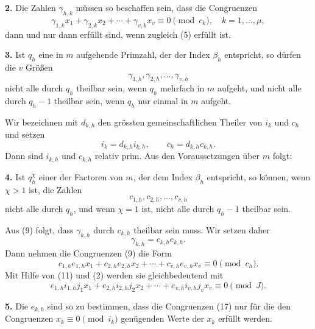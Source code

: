 \documentclass[11pt]{article}
\begin{document}
\medskip
\noindent\textbf{2.} Die Zahlen $\gamma_{h,k}$ müssen so beschaffen sein, dass die Congruenzen
\begin{equation}
 \gamma_{1,k}x_1+\gamma_{2,k}x_2+\cdots+\gamma_{v,k}x_v\equiv0\pmod {c_k},
 \quad k=1,
\ldots,\mu,
\tag{9}
\end{equation}
dann und nur dann erfüllt sind, wenn zugleich (5) erfüllt ist.

\medskip
\noindent\textbf{3.} Ist $q_h$ eine in $m$ aufgehende Primzahl, der der Index $\beta_h$ entspricht, so dürfen die $v$ Größen
\[
 \gamma_{1,h},\gamma_{2,h},
\ldots,\gamma_{v,h}
\]
nicht alle durch $q_h$ theilbar sein, wenn $q_h$ mehrfach in $m$ aufgeht, und nicht alle durch $q_h-1$ theilbar sein, wenn $q_h$ nur einmal in $m$ aufgeht.

Wir bezeichnen mit $d_{k,h}$ den grössten gemeinschaftlichen Theiler von $i_k$ und $c_h$ und setzen
\begin{equation}
 i_k=d_{k,h}i_{k,h},\qquad c_h=d_{k,h}c_{k,h}.
\tag{11}
\end{equation}
Dann sind $i_{k,h}$ und $c_{k,h}$ relativ prim. Aus den Voraussetzungen über $m$ folgt:

\medskip
\noindent\textbf{4.} Ist $q_h^\chi$ einer der Factoren von $m$, der dem Index $\beta_h$ entspricht, so können, wenn $\chi>1$ ist, die Zahlen
\begin{equation}
 c_{1,h},c_{2,h},
\ldots,c_{v,h}
\tag{12}
\end{equation}
nicht alle durch $q_h$, und wenn $\chi=1$ ist, nicht alle durch $q_h-1$ theilbar sein.

Aus (9) folgt, dass $\gamma_{k,h}$ durch $c_{k,h}$ theilbar sein muss. Wir setzen daher
\begin{equation}
 \gamma_{k,h}=c_{k,h}e_{k,h}.
\tag{15}
\end{equation}
Dann nehmen die Congruenzen (9) die Form
\begin{equation}
 c_{1,h}e_{1,h}x_1+c_{2,h}e_{2,h}x_2+
\cdots+c_{v,h}e_{v,h}x_v\equiv0\pmod {c_h}.
\tag{16}
\end{equation}
Mit Hilfe von (11) und (2) werden sie gleichbedeutend mit
\begin{equation}
 e_{1,h}i_{1,h}j_1x_1+e_{2,h}i_{2,h}j_2x_2+
\cdots+e_{v,h}i_{v,h}j_vx_v\equiv0\pmod J.
\tag{17}
\end{equation}

\medskip
\noindent\textbf{5.} Die $e_{k,h}$ sind so zu bestimmen, dass die Congruenzen (17) nur für die den Congruenzen $x_k\equiv0\pmod {i_k}$ genügenden Werte der $x_k$ erfüllt werden.
\end{document}
